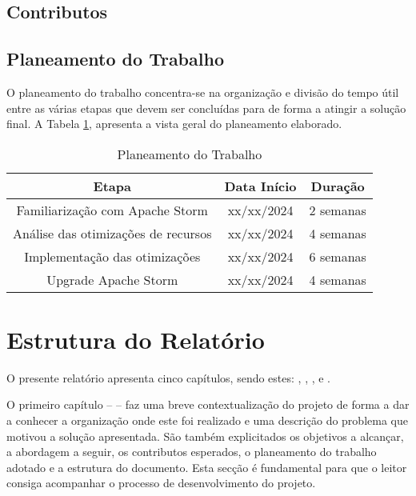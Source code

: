 \subsection{Contributos}



\subsection{Planeamento do Trabalho}

O planeamento do trabalho concentra-se na organização e divisão do tempo útil entre as 
várias etapas que devem ser concluídas para de forma a atingir a solução final. A Tabela 
\ref{tab:plan}, apresenta a vista geral do planeamento elaborado.

\begin{table}[H]
  \begin{center}
    \caption{Planeamento do Trabalho}
    \vspace{5mm}
    \label{tab:plan}
    \begin{tabular}{|c|c|c|}
      \hline
      \textbf{Etapa} & \textbf{Data Início} & \textbf{Duração} \\ \hline
      Familiarização com Apache Storm  & xx/xx/2024 & 2 semanas \\ \hline
      Análise das otimizações de recursos & xx/xx/2024 & 4 semanas \\ \hline
      Implementação das otimizações & xx/xx/2024 & 6 semanas \\ \hline
      Upgrade Apache Storm & xx/xx/2024 & 4 semanas \\ \hline
    \end{tabular}
  \end{center}
\end{table}

\section{Estrutura do Relatório}

O presente relatório apresenta cinco capítulos, sendo estes: ,
, ,  e
.

O primeiro capítulo –  – faz uma breve contextualização do projeto de
forma a dar a conhecer a organização onde este foi realizado e uma descrição do problema que motivou
a solução apresentada. São também explicitados os objetivos a alcançar, a abordagem a seguir, os
contributos esperados, o planeamento do trabalho adotado e a estrutura do documento. Esta secção é 
fundamental para que o leitor consiga acompanhar o processo de desenvolvimento do projeto.

